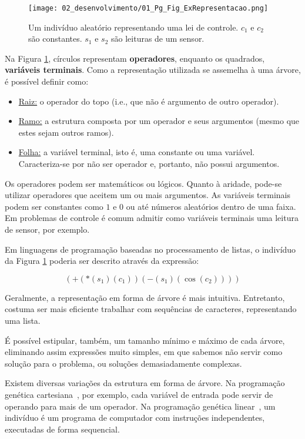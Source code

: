 \begin{figure}[!htb]
\centering
\texttt{[image: 02\_desenvolvimento/01\_Pg\_Fig\_ExRepresentacao.png]}
\caption{Um indivíduo aleatório representando uma lei de controle. $c_1$ e $c_2$ são constantes. $s_1$ e $s_2$ são leituras de um sensor.}\label{fig:1pg-exrepresentacao}
\end{figure}

Na Figura \ref{fig:1pg-exrepresentacao}, círculos representam \textbf{operadores}, enquanto os quadrados, \textbf{variáveis terminais}. Como a representação utilizada se assemelha à uma árvore, é possível definir como:

\begin{itemize}[label=\raisebox{0.25ex}{\tiny$\bullet$}]
	\item \underline{Raiz:} o operador do topo (i.e., que não é argumento de outro operador).
	\item \underline{Ramo:} a estrutura composta por um operador e seus argumentos (mesmo que estes sejam outros ramos).
	\item \underline{Folha:} a variável terminal, isto é, uma constante ou uma variável. Caracteriza-se por não ser operador e, portanto, não possui argumentos.
\end{itemize}

Os operadores podem ser matemáticos ou lógicos. Quanto à aridade, pode-se utilizar operadores que aceitem um ou mais argumentos. As variáveis terminais podem ser constantes como $1$ e $0$ ou até números aleatórios dentro de uma faixa. Em problemas de controle é comum admitir como variáveis terminais uma leitura de sensor, por exemplo.

Em linguagens de programação baseadas no processamento de listas, o indivíduo da Figura \ref{fig:1pg-exrepresentacao} poderia ser descrito através da expressão:

\begin{equation*}
(+(*(s_1)(c_1))(-(s_1)(\cos(c_2))))
\end{equation*}

Geralmente, a representação em forma de árvore é mais intuitiva. Entretanto, costuma ser mais eficiente trabalhar com sequências de caracteres, representando uma lista.

É possível estipular, também, um tamanho mínimo e máximo de cada árvore, eliminando assim expressões muito simples, em que sabemos não servir como solução para o problema, ou soluções demasiadamente complexas.

Existem diversas variações da estrutura em forma de árvore. Na programação genética cartesiana~\cite{miller08Cgp}, por exemplo, cada variável de entrada pode servir de operando para mais de um operador. Na programação genética linear~\cite{douglas05Pgl}, um indivíduo é um programa de computador com instruções independentes, executadas de forma sequencial.

